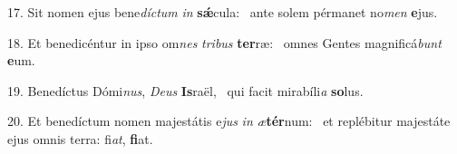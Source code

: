 17. Sit nomen ejus bene\textit{díc}\textit{tum} \textit{in} \textbf{sǽ}cula: \ast\  ante solem pérmanet no\textit{men} \textbf{e}jus.\

18. Et benedicéntur in ipso om\textit{nes} \textit{tri}\textit{bus} \textbf{ter}ræ: \ast\  omnes Gentes magnificá\textit{bunt} \textbf{e}um.\

19. Benedíctus Dómi\textit{nus}, \textit{De}\textit{us} \textbf{Is}raël, \ast\  qui facit mirabíli\textit{a} \textbf{so}lus.\

20. Et benedíctum nomen majestátis e\textit{jus} \textit{in} \textit{æ}\textbf{tér}num: \ast\  et replébitur majestáte ejus omnis terra: fi\textit{at}, \textbf{fi}at.\

